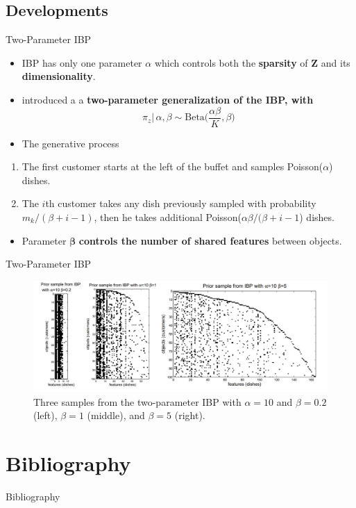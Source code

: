 \documentclass[aspectratio=169,xcolor=dvipsnames]{beamer}
\newcommand{\matz}{\textbf{Z}}
\begin{document}
\subsection{Developments}
\begin{frame}{Two-Parameter IBP}
\setlength{\leftmargini}{0.2cm}
\begin{itemize}
\item IBP has only one parameter $ \alpha$ which controls both the \textbf{sparsity} of $\matz$ and its \textbf{dimensionality}.
\item \cite{Ghahramani_2007} introduced a a \textbf{two-parameter generalization of the IBP, with}
\begin{equation*}
    \pi_z | \, \alpha, \beta \sim \text{Beta}\Big(\frac{\alpha\beta}{K},\beta\Big)
\end{equation*}
\item The generative process
\end{itemize}
\setlength{\leftmargini}{0.6cm}
\begin{enumerate}
\item The first customer starts at the left of the buffet and samples Poisson($\alpha$) dishes. 
\item The $i$th customer takes any dish previously sampled with probability  $m_k/(\beta + i - 1)$, then he takes additional Poisson($\alpha\beta /(\beta +i-1$) dishes.
\end{enumerate}
\setlength{\leftmargini}{0.2cm}
\begin{itemize}
\item Parameter $\boldsymbol{\beta}$ \textbf{controls the  number of shared features} between objects.
\end{itemize}
\end{frame}
\begin{frame}{Two-Parameter IBP}
\begin{figure}
    \centering\includegraphics[width=1\columnwidth]{utilities/two_parameters_IBP.png}
    \caption{ Three samples from the two-parameter IBP with $ \alpha = 10$ and $\beta = 0.2$ (left), $\beta = 1$ (middle), and $\beta = 5$ (right).}
    \label{fig:twoP_IBP}
\end{figure}
\end{frame}
\section{Bibliography}
\begin{frame}[allowframebreaks]{Bibliography}

\nocite{gr_gh_IBP_2011}

\end{frame}

\end{document}

